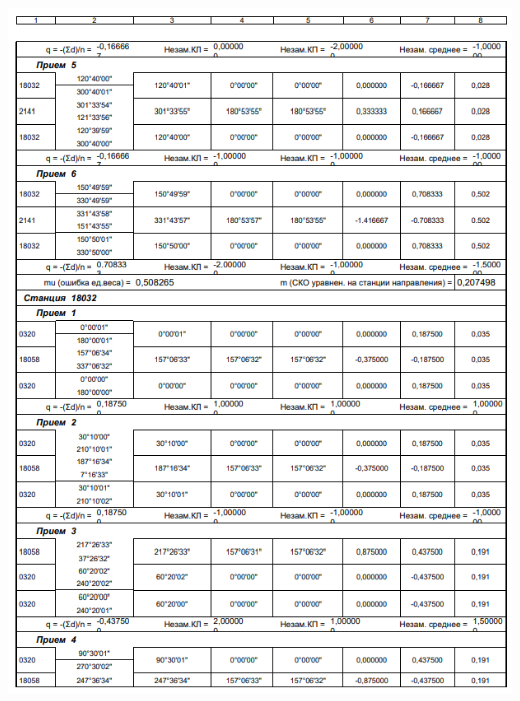 \documentclass[a4paper]{article}
\begin{document}
\begin{newpage}
\begin{center}
        \includegraphics[scale=1.4]{vedomosty/скп12.png}

\end{center}
\end{newpage}
\end{document}
